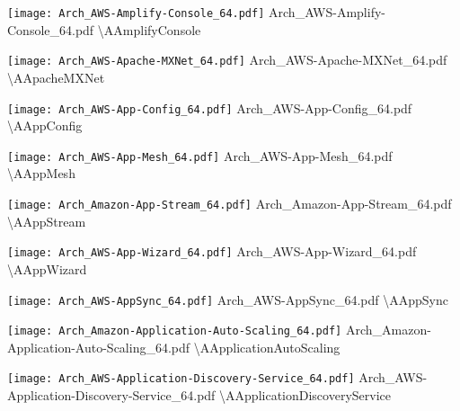  {\texttt{[image: Arch\_AWS-Amplify-Console\_64.pdf]}} {Arch\_AWS-Amplify-Console\_64.pdf} {{\textbackslash}AAmplifyConsole}

 {\texttt{[image: Arch\_AWS-Apache-MXNet\_64.pdf]}} {Arch\_AWS-Apache-MXNet\_64.pdf} {{\textbackslash}AApacheMXNet}

 {\texttt{[image: Arch\_AWS-App-Config\_64.pdf]}} {Arch\_AWS-App-Config\_64.pdf} {{\textbackslash}AAppConfig}

 {\texttt{[image: Arch\_AWS-App-Mesh\_64.pdf]}} {Arch\_AWS-App-Mesh\_64.pdf} {{\textbackslash}AAppMesh}

 {\texttt{[image: Arch\_Amazon-App-Stream\_64.pdf]}} {Arch\_Amazon-App-Stream\_64.pdf} {{\textbackslash}AAppStream}

 {\texttt{[image: Arch\_AWS-App-Wizard\_64.pdf]}} {Arch\_AWS-App-Wizard\_64.pdf} {{\textbackslash}AAppWizard}

 {\texttt{[image: Arch\_AWS-AppSync\_64.pdf]}} {Arch\_AWS-AppSync\_64.pdf} {{\textbackslash}AAppSync}

 {\texttt{[image: Arch\_Amazon-Application-Auto-Scaling\_64.pdf]}} {Arch\_Amazon-Application-Auto-Scaling\_64.pdf} {{\textbackslash}AApplicationAutoScaling}

 {\texttt{[image: Arch\_AWS-Application-Discovery-Service\_64.pdf]}} {Arch\_AWS-Application-Discovery-Service\_64.pdf} {{\textbackslash}AApplicationDiscoveryService}

